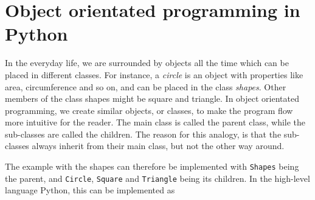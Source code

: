 \section{Object orientated programming in Python}
In the everyday life, we are surrounded by objects all the time which can be placed in different classes. For instance, a \textit{circle} is an object with properties like area, circumference and so on, and can be placed in the class \textit{shapes}. Other members of the class shapes might be square and triangle. In object orientated programming, we create similar objects, or classes, to make the program flow more intuitive for the reader. The main class is called the parent class, while the sub-classes are called the children. The reason for this analogy, is that the sub-classes always inherit from their main class, but not the other way around. 

The example with the shapes can therefore be implemented with \texttt{Shapes} being the parent, and \texttt{Circle}, \texttt{Square} and \texttt{Triangle} being its children. In the high-level language Python, this can be implemented as 

